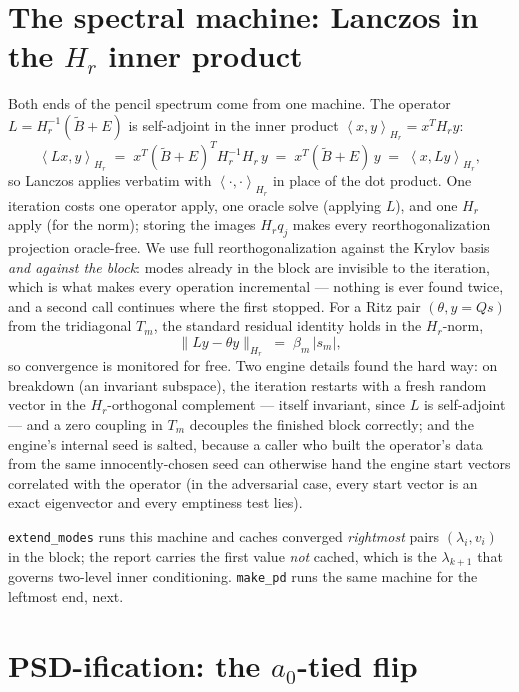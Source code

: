 \documentclass[11pt]{article}
\newcommand{\Bt}{\widetilde{B}}
\newcommand{\Hr}{H_r}
\newcommand{\ip}[2]{\left\langle #1, #2 \right\rangle_{\Hr}}
\begin{document}
\section{The spectral machine: Lanczos in the $\Hr$ inner product}
\label{sec:lanczos}

Both ends of the pencil spectrum come from one machine. The operator
$L = \Hr^{-1}(\Bt + E)$ is self-adjoint in the inner product
$\ip{x}{y} = x^T \Hr y$:
\begin{equation}
  \ip{Lx}{y} \;=\; x^T (\Bt + E)^T \Hr^{-1} \Hr\, y
  \;=\; x^T (\Bt + E)\, y \;=\; \ip{x}{Ly},
\end{equation}
so Lanczos applies verbatim with $\ip{\cdot}{\cdot}$ in place of the dot
product. One iteration costs one operator apply, one oracle solve
(applying $L$), and one $\Hr$ apply (for the norm); storing the images
$\Hr q_j$ makes every reorthogonalization projection oracle-free. We use
full reorthogonalization against the Krylov basis \emph{and against the
block}: modes already in the block are invisible to the iteration, which
is what makes every operation incremental --- nothing is ever found
twice, and a second call continues where the first stopped. For a Ritz
pair $(\theta, y = Q s)$ from the tridiagonal $T_m$, the standard residual
identity holds in the $\Hr$-norm,
\begin{equation}
  \bigl\| L y - \theta y \bigr\|_{\Hr} \;=\; \beta_m\, |s_m|,
  \label{eq:ritz-residual}
\end{equation}
so convergence is monitored for free. Two engine details found the hard
way: on breakdown (an invariant subspace), the iteration restarts with a
fresh random vector in the $\Hr$-orthogonal complement --- itself
invariant, since $L$ is self-adjoint --- and a zero coupling in $T_m$
decouples the finished block correctly; and the engine's internal seed is
salted, because a caller who built the operator's data from the same
innocently-chosen seed can otherwise hand the engine start vectors
correlated with the operator (in the adversarial case, every start vector
is an exact eigenvector and every emptiness test lies).

\texttt{extend\_modes} runs this machine and caches converged
\emph{rightmost} pairs $(\lambda_i, v_i)$ in the block; the report carries
the first value \emph{not} cached, which is the $\lambda_{k+1}$ that
governs two-level inner conditioning. \texttt{make\_pd} runs the same
machine for the leftmost end, next.

\section{PSD-ification: the $a_0$-tied flip}
\label{sec:flip}
\end{document}
